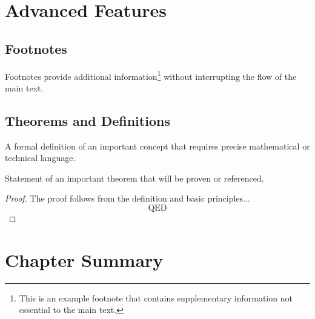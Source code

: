 \section{Advanced Features}
\label{sec:advanced}

\subsection*{Footnotes}
\label{subsec:footnotes}

Footnotes provide additional information\footnote{This is an example footnote
	that contains supplementary information not essential to the main text.} without
interrupting the flow of the main text.

\subsection*{Theorems and Definitions}
\label{subsec:theorems}

\begin{definition}
	A formal definition of an important concept that requires precise
	mathematical or technical language.
\end{definition}

\begin{theorem}
	\label{thm:fundamental}
	Statement of an important theorem that will be proven or referenced.
\end{theorem}

\begin{proof}
	The proof follows from the definition and basic principles...
	\[
		\text{QED}
	\]
\end{proof}

\section{Chapter Summary}
\label{sec:chapter_summary}

